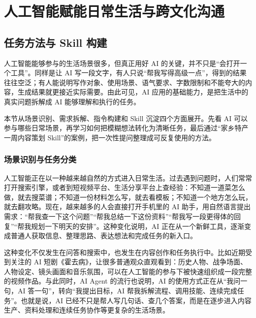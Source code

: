 \setcounter{chapter}{7}
\chapter{人工智能赋能日常生活与跨文化沟通}



\section{任务方法与 Skill 构建}

人工智能能够参与的生活场景很多，但真正用好 AI 的关键，并不只是“会打开一个工具”。同样是让 AI 写一段文字，有人只说“帮我写得高级一点”，得到的结果往往空泛；有人能说明写作对象、使用场景、语气要求、字数限制和不能夸大的内容，生成结果就更接近实际需要。由此可见，AI 应用的基础能力，是把生活中的真实问题拆解成 AI 能够理解和执行的任务。

本节从场景识别、需求拆解、指令构建和 Skill 沉淀四个方面展开。先看 AI 可以参与哪些日常场景，再学习如何把模糊想法转化为清晰任务，最后通过“家乡特产一周内容策划 Skill”的案例，把一次性提问整理成可反复使用的方法。


\subsection{场景识别与任务分类}

人工智能正在以一种越来越自然的方式进入日常生活。过去遇到问题时，人们常常打开搜索引擎，或者到短视频平台、生活分享平台上查经验：不知道一道菜怎么做，就去搜菜谱；不知道一份材料怎么写，就去看模板；不知道一个地方怎么玩，就去翻攻略。现在，越来越多的人会直接打开手机里的 AI 助手，用自然语言提出需求：“帮我查一下这个问题”“帮我总结一下这份资料”“帮我写一段更得体的回复”“帮我规划一下明天的安排”。这种变化说明，AI 正在从一个新鲜工具，逐渐变成普通人获取信息、整理思路、表达想法和完成任务的新入口。

这种变化不仅发生在问答和搜索中，也发生在内容创作和任务执行中。比如近期受到关注的 AI 短剧《霍去病》，让很多普通观众直观看到：历史人物、战争场面、人物设定、镜头画面和音乐氛围，可以在人工智能的参与下被快速组织成一段完整的视频作品。与此同时，AI Agent 的流行也说明，AI 的使用方式正在从“我问一句，AI 答一句”，转向“我提出目标，AI 帮我拆解流程、调用技能、连续完成任务”。也就是说，AI 已经不只是帮人写几句话、查几个答案，而是在逐步进入内容生产、资料处理和连续任务协作等更复杂的生活场景。

